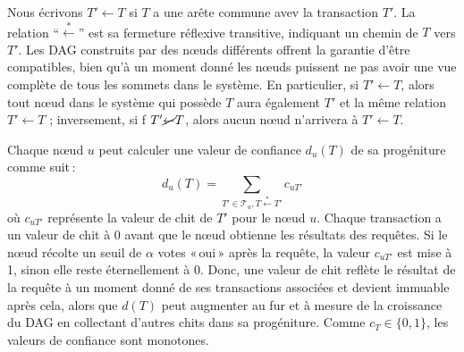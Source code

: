 Nous écrivons $T' \gets T$ si $T$ a une arête commune avev la transaction $T'$.
La relation ``$\stackrel{*}{\gets}$'' est sa fermeture réfle\-xive transitive, indiquant un chemin de $T$ vers $T'$.
Les DAG construits par des nœuds différents offrent la garantie d'être compatibles, bien qu'à un moment donné les nœuds puissent ne pas avoir une vue complète de tous les sommets dans le système.
En particulier, si $T' \gets T$, alors tout nœud dans le système qui possède $T$ aura également $T'$ et la même relation $T' \gets T$ ; inversement, si f $T' \cancel{\gets} T$, alors aucun nœud n'arrivera à $T' \gets T$.

Chaque nœud $u$ peut calculer une valeur de confiance $d_u(T)$ de sa progéniture comme suit\,:
\[ d_u(T) = \sum_{T' \in \mathcal{T}_u, T \stackrel{*}{\gets} T'}c_{uT'}\]
où $c_{uT'}$ représente la valeur de chit de $T'$ pour le nœud $u$. Chaque transaction a un valeur de chit à $0$ avant que le nœud obtienne les résultats des requêtes. Si le nœud récolte un seuil de $\alpha$ votes «\,oui\,» après la requête, la valeur $c_{uT'}$ est mise à 1, sinon elle reste éternellement à $0$.
Donc, une valeur de chit reflète le résultat de la requête à un moment donné de ses transactions associées et devient immuable après cela, alors que $d(T)$ peut augmenter au fur et à mesure de la croissance du DAG en collectant d'autres chits dans sa progéniture.
Comme $c_T \in \{0, 1\}$, les valeurs de confiance sont monotones.

